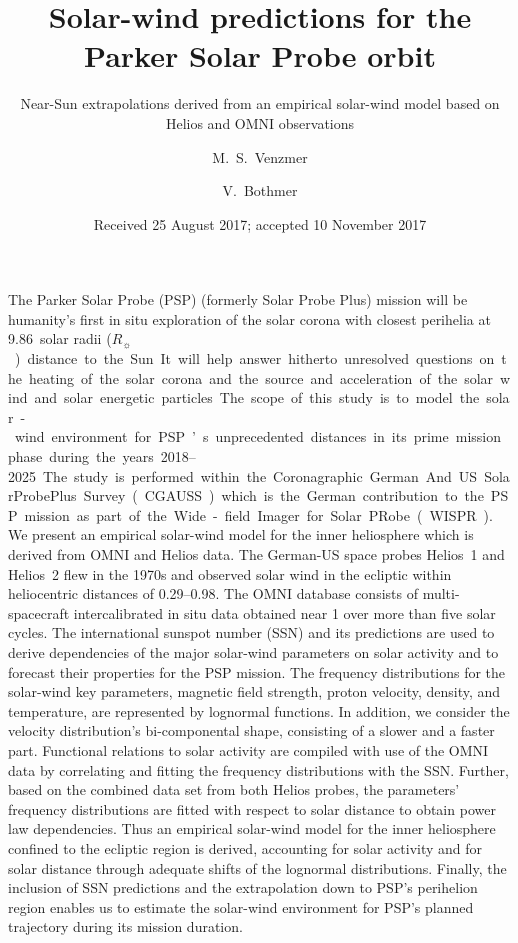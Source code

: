 \documentclass[]{aa}
\newcommand{\Rs}{$R_\sun{}$}
\begin{document}
        \title{Solar-wind predictions for the Parker Solar Probe orbit}
        \subtitle{Near-Sun extrapolations derived from an empirical solar-wind model based on Helios and OMNI observations}
        \author{M.~S.~Venzmer
        \and V.~Bothmer}
        \date{Received 25 August 2017; accepted 10 November 2017}

        \abstract
        {The Parker Solar Probe (PSP) (formerly Solar Probe Plus) mission will be humanity’s first in situ exploration of the solar corona with closest perihelia at \num{9.86}~solar radii (\si{\Rs}) distance to the Sun. It will help answer hitherto unresolved questions on the heating of the solar corona and the source and acceleration of the solar wind and solar energetic particles. The scope of this study is to model the solar-wind environment for PSP’s unprecedented distances in its prime mission phase during the years \numrange{2018}{2025}. The study is performed within the Coronagraphic German And US SolarProbePlus Survey (CGAUSS)   which is the German contribution to the PSP mission as part of the Wide-field Imager for Solar PRobe (WISPR).}
        {We present an empirical solar-wind model for the inner heliosphere which is derived from OMNI and Helios data. The German-US space probes Helios~1 and Helios~2 flew in the 1970s and observed solar wind in the ecliptic within heliocentric distances of \SIrange{0.29}{0.98}{\au}. The OMNI database consists of multi-spacecraft intercalibrated in situ data obtained near \SI{1}{\au} over more than five solar cycles. The international sunspot number (SSN) and its predictions are used to derive dependencies of the major solar-wind parameters on solar activity and to forecast their properties for the PSP mission.}
        {The frequency distributions for the solar-wind key parameters, magnetic field strength, proton velocity, density, and temperature, are represented by lognormal functions. In addition, we consider the velocity distribution’s bi-componental shape, consisting of a slower and a faster part. Functional relations to solar activity are compiled with use of the OMNI data by correlating and fitting the frequency distributions with the SSN. Further, based on the combined data set from both Helios probes, the parameters’ frequency distributions are fitted with respect to solar distance to obtain power law dependencies. Thus an empirical solar-wind model for the inner heliosphere confined to the ecliptic region is derived, accounting for solar activity and for solar distance through adequate shifts of the lognormal distributions. Finally, the inclusion of SSN predictions and the extrapolation down to PSP’s perihelion region enables us to estimate the solar-wind environment for PSP’s planned trajectory during its mission duration.}
\end{document}
